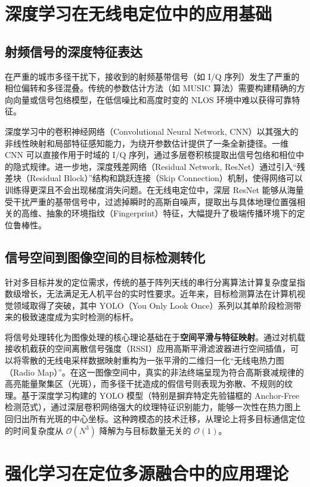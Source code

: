 \section{深度学习在无线电定位中的应用基础}

\subsection{射频信号的深度特征表达}

在严重的城市多径干扰下，接收到的射频基带信号（如 I/Q 序列）发生了严重的相位偏转和多径混叠。传统的参数估计方法（如 MUSIC 算法）需要构建精确的方向向量或信号包络模型，在低信噪比和高度时变的 NLOS 环境中难以获得可靠特征。

深度学习中的卷积神经网络（Convolutional Neural Network, CNN）以其强大的非线性映射和局部特征感知能力，为绕开参数估计提供了一条全新捷径。一维 CNN 可以直接作用于时域的 I/Q 序列，通过多层卷积核提取出信号包络和相位中的隐式规律。进一步地，深度残差网络（Residual Network, ResNet）通过引入“残差块（Residual Block）”结构和跳跃连接（Skip Connection）机制，使得网络可以训练得更深且不会出现梯度消失问题。在无线电定位中，深层 ResNet 能够从海量受干扰严重的基带信号中，过滤掉瞬时的高斯自噪声，提取出与具体地理位置强相关的高维、抽象的环境指纹（Fingerprint）特征，大幅提升了极端传播环境下的定位鲁棒性。

\subsection{信号空间到图像空间的目标检测转化}

针对多目标并发的定位需求，传统的基于阵列天线的串行分离算法计算复杂度呈指数级增长，无法满足无人机平台的实时性要求。近年来，目标检测算法在计算机视觉领域取得了突破，其中 YOLO（You Only Look Once）系列以其单阶段检测带来的极致速度成为实时检测的标杆。

将信号处理转化为图像处理的核心理论基础在于\textbf{空间平滑与特征映射}。通过对机载接收机截获的空间离散信号强度（RSSI）应用高斯平滑滤波器进行空间插值，可以将零散的无线电采样数据映射重构为一张平滑的二维归一化“无线电热力图（Radio Map）”。在这一图像空间中，真实的非法终端呈现为符合高斯衰减规律的高亮能量聚集区（光斑），而多径干扰造成的假信号则表现为弥散、不规则的纹理。基于深度学习构建的 YOLO 模型（特别是摒弃特定先验锚框的 Anchor-Free 检测范式），通过深层卷积网络强大的纹理特征识别能力，能够一次性在热力图上回归出所有光斑的中心坐标。这种跨模态的技术迁移，从理论上将多目标通信定位的时间复杂度从 $\mathcal{O}(N^3)$ 降解为与目标数量无关的 $\mathcal{O}(1)$。

\section{强化学习在定位多源融合中的应用理论}

